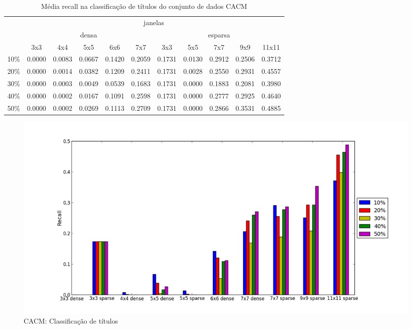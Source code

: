 \documentclass[a4paper,11pt]{article}
\begin{document}
  \begin{center}
    \begin{table}[p]
      \caption{Média recall na classificação de títulos do conjunto de dados CACM}
      \begin{tabular}{ l | c c c c c || c c c c c | }
        \cline{2-11}
        & \multicolumn{10}{|c|}{janelas} \\
        \cline{2-11}
        & \multicolumn{5}{c||}{densa} & \multicolumn{5}{c|}{esparsa} \\
        \cline{2-11}
        & 3x3 & 4x4 & 5x5 & 6x6 & 7x7 & 3x3 & 5x5 & 7x7 & 9x9 & 11x11 \\
        \hline
        \multicolumn{1}{|l|}{10\%}& 0.0000& 0.0083& 0.0667& 0.1420& 0.2059& 0.1731& 0.0130& 0.2912& 0.2506& 0.3712\\
        \multicolumn{1}{|l|}{20\%}& 0.0000& 0.0014& 0.0382& 0.1209& 0.2411& 0.1731& 0.0028& 0.2550& 0.2931& 0.4557\\
        \multicolumn{1}{|l|}{30\%}& 0.0000& 0.0003& 0.0049& 0.0539& 0.1683& 0.1731& 0.0000& 0.1883& 0.2081& 0.3980\\
        \multicolumn{1}{|l|}{40\%}& 0.0000& 0.0002& 0.0167& 0.1091& 0.2598& 0.1731& 0.0000& 0.2777& 0.2925& 0.4640\\
        \multicolumn{1}{|l|}{50\%}& 0.0000& 0.0002& 0.0269& 0.1113& 0.2709& 0.1731& 0.0000& 0.2866& 0.3531& 0.4885\\
        \hline  
      \end{tabular}
    \end{table}
  \end{center}

  \begin{figure}[p]
    \centerline{\includegraphics[width=1.2\textwidth]{assets/experiment_charts/cacm_TextRegion_heading_recall_or_sensitivity.png}}
    \caption{CACM: Classificação de títulos}
    \label{fig:cacm_TextRegion_heading_recall_or_sensitivity}
  \end{figure}
\end{document}
